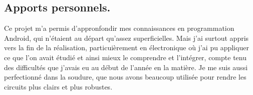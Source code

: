 \subsection{Apports personnels.}

Ce projet m'a permis d'appronfondir mes connaissances en programmation Android, qui n'étaient au départ qu'assez superficielles. Mais j'ai surtout appris vers la fin de la réalisation, particuièrement en électronique où j'ai pu appliquer ce que l'on avait étudié et ainsi mieux le comprendre et l'intégrer, compte tenu des difficultés que j'avais eu au début de l'année en la matière. Je me suis aussi perfectionné dans la soudure, que nous avons beaucoup utilisée pour rendre les circuits plus clairs et plus robustes.
